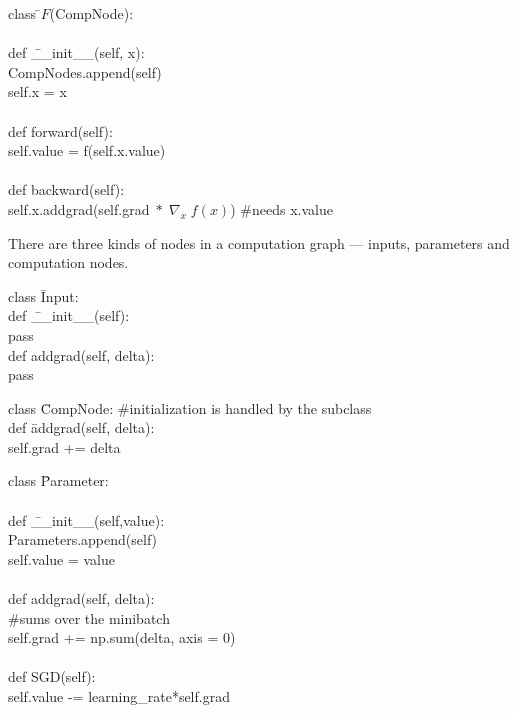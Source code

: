 {

\begin{tabbing}
  class \=$F$(CompNode): \\
  \\
    \>def \=\_\_init\_\_(self, x): \\
        \>\>CompNodes.append(self) \\
        \>\>self.x = x \\
\\
    \>def forward(self): \\
        \>\>self.value = f(self.x.value) \\
\\
    \>def backward(self): \\
        \>\>self.x.addgrad(self.grad$ \;*\; \nabla_x\;f(x)$) \hspace{2em} \#needs x.value
\end{tabbing}


There are three kinds of nodes in a computation graph --- inputs, parameters and computation nodes.

\vfill
\begin{tabbing}
class \=Input: \\
    \>def \=\_\_init\_\_(self): \\
        \>\>pass \\
    \>def \>addgrad(self, delta): \\
    \>\>pass
\end{tabbing}

\vfill
\begin{tabbing}
class \=CompNode: \#initialization is handled by the subclass \\
   \>def \=addgrad(self, delta): \\
   \>\>self.grad += delta
\end{tabbing}

\slide{}

\begin{tabbing}
class \=Parameter: \\
    \\
    \>def \=\_\_init\_\_(self,value): \\
        \>\>Parameters.append(self) \\
        \>\>self.value = value \\
\\
    \>def \>addgrad(self, delta): \\
          \>\>\#sums over the minibatch \\
    \>\>self.grad += np.sum(delta, axis = 0) \\
    \\
    \>def \>SGD(self): \\
    \>\>self.value -= learning\_rate*self.grad
\end{tabbing}

}
